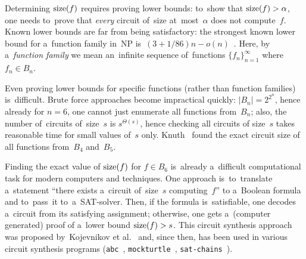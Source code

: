Determining $\operatorname{size}(f)$ requires
proving lower bounds:
to~show that $\operatorname{size}(f)> \alpha$,
one needs to~prove that \emph{every} circuit
of~size at~most~$\alpha$ does not compute~$f$.
Known lower bounds are far from being satisfactory:
the strongest known lower bound for a~function family
in~NP is~$(3+1/86)n-o(n)$~\cite{DBLP:conf/focs/FindGHK16}.
Here, by a~\emph{function family} we mean an~infinite sequence of~functions $\{f_n\}_{n=1}^{\infty}$ where $f_n \in B_n$.

Even proving lower bounds for specific functions (rather than function families) is~difficult. Brute force approaches become impractical quickly: $|B_n|=2^{2^n}$, hence already for $n=6$, one cannot just enumerate all
functions from~$B_n$; also, the number of~circuits
of~size~$s$ is $s^{\Theta(s)}$, hence checking all circuits of size~$s$ takes reasonable time for small values of~$s$ only.
Knuth~\cite{Knuth:2008:ACP:1377542} found the exact circuit size of all functions from~$B_4$ and~$B_5$.

Finding the exact value of $\operatorname{size}(f)$ for $f \in B_6$
is~already a~difficult computational task for modern
computers and techniques. One approach
is~to~translate a~statement ``there exists a~circuit
of~size~$s$ computing~$f$'' to a~Boolean formula and
to~pass~it to~a~SAT-solver. Then, if the formula
is~satisfiable, one decodes a~circuit from its satisfying
assignment; otherwise, one gets a~(computer generated) proof of a~lower bound $\operatorname{size}(f) > s$. This circuit synthesis approach was proposed
by~Kojevnikov et al.~\cite{DBLP:conf/sat/KojevnikovKY09}
and, since then, has been used in various circuit synthesis programs (\texttt{abc}~\cite{abc}, \texttt{mockturtle}~\cite{EPFLLibraries}, \texttt{sat-chains}~\cite{knuthreduction}).

